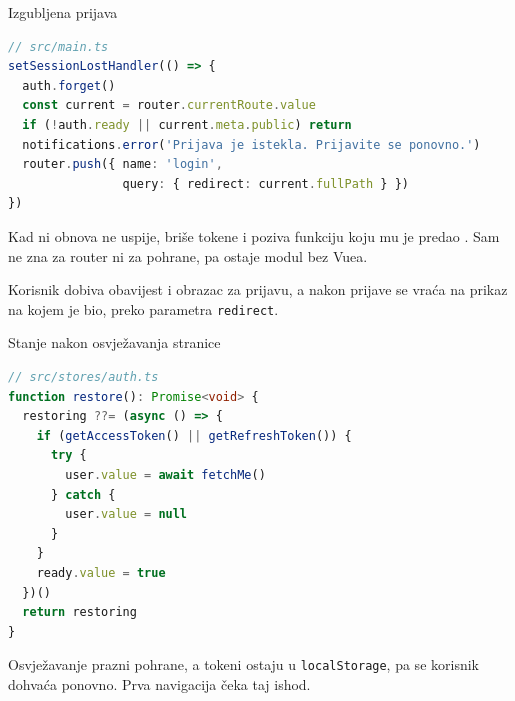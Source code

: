 \begin{frame}[fragile]{Izgubljena prijava}
\begin{lstlisting}[language=typescript]
// src/main.ts
setSessionLostHandler(() => {
  auth.forget()
  const current = router.currentRoute.value
  if (!auth.ready || current.meta.public) return
  notifications.error('Prijava je istekla. Prijavite se ponovno.')
  router.push({ name: 'login',
                query: { redirect: current.fullPath } })
})
\end{lstlisting}

\vspace{0.4em}
Kad ni obnova ne uspije,  briše tokene i poziva funkciju koju mu je predao . Sam ne zna za router ni za pohrane, pa ostaje modul bez Vuea.

\vspace{0.4em}
Korisnik dobiva obavijest i obrazac za prijavu, a nakon prijave se vraća na prikaz na kojem je bio, preko parametra \texttt{redirect}.
\end{frame}

\begin{frame}[fragile]{Stanje nakon osvježavanja stranice}
\begin{lstlisting}[language=typescript]
// src/stores/auth.ts
function restore(): Promise<void> {
  restoring ??= (async () => {
    if (getAccessToken() || getRefreshToken()) {
      try {
        user.value = await fetchMe()
      } catch {
        user.value = null
      }
    }
    ready.value = true
  })()
  return restoring
}
\end{lstlisting}

\vspace{0.2em}
Osvježavanje prazni pohrane, a tokeni ostaju u \texttt{localStorage}, pa se korisnik dohvaća ponovno. Prva navigacija čeka taj ishod.
\end{frame}

